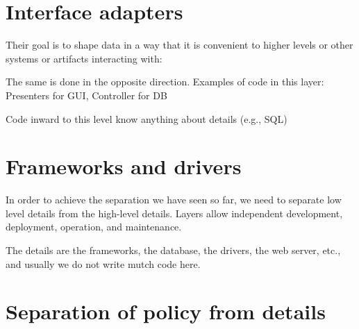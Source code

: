 \section{Interface adapters}
Their goal is to shape data in a way that it is convenient to higher
levels or other systems or artifacts interacting with:

The same is done in the opposite direction. Examples of code in this
layer: Presenters for GUI, Controller for DB

Code inward to this level know anything about details (e.g., SQL)


\section{Frameworks and drivers}

In order to achieve the separation we have seen so far, we need to separate
low level details from the high-level details.
Layers allow independent development, deployment, operation, and
maintenance.


The details are the frameworks, the database, the drivers, the web server, etc.,
and usually we do not write mutch code here.


\section{Separation of policy from details}





